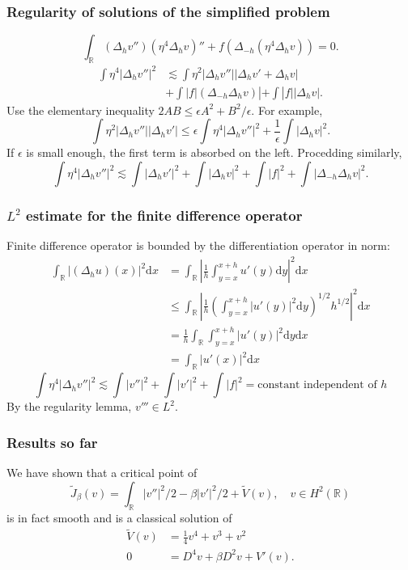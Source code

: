 \documentclass[9pt, english]{beamer}
\theoremstyle{definition}
\newcommand{\R}{\mathbb{R}}                     %
\begin{document}
\begin{frame}
\frametitle{Regularity of solutions of the simplified problem}
\[
\int_\R (\Delta_h v'') (\eta^4 \Delta_h v)'' + f (\Delta_{-h}
(\eta^4 \Delta_h v)) = 0.
\]
\begin{align*}
\int \eta^4 |\Delta_h v''|^2 &\lesssim
\int \eta^2 |\Delta_h v''| |\Delta_h v' + \Delta_h v|\\
&+ \int |f| (\Delta_{-h}\Delta_h v)| + \int |f| |\Delta_h v |.
\end{align*}
\pause Use the elementary inequality $2AB \leq \epsilon A^2 +
B^2/\epsilon$. For example,
\[
\int \eta^2 |\Delta_h v''| |\Delta_h v'| \leq \epsilon \int \eta^4
|\Delta_h v''|^2 + \frac1\epsilon \int |\Delta_h v|^2.
\]
\pause If $\epsilon$ is small enough, the first term is absorbed on
the left. Procedding similarly,
\[
\int \eta^4 |\Delta_h v''|^2 \lesssim \int |\Delta_h v'|^2 + \int
|\Delta_h v|^2 + \int |f|^2 + \int |\Delta_{-h}\Delta_h v|^2.
\]
\end{frame}

\begin{frame}
\frametitle{$L^2$ estimate for the finite difference operator}
\newcommand{\dif}{\text{d}}
Finite difference operator is bounded by the differentiation
operator in norm:
\begin{align*}
\int_\R |(\Delta_h u)(x)|^2 \dif x &= \int_\R \left| \frac{1}{h}
\int_{y=x}^{x+h} u'(y) \dif y
\right|^2 \dif x\\
&\leq \int_\R \left| \frac{1}{h} \left(\int_{y=x}^{x+h} |u'(y)|^2
\dif y \right)^{1/2} h^{1/2}
\right|^2 \dif x\\
&= \frac{1}{h} \int_\R \int_{y=x}^{x+h} |u'(y)|^2 \dif y
\dif x\\
&= \int_\R |u'(x)|^2 \dif x
\end{align*}
\pause
\[
\int \eta^4 |\Delta_h v''|^2 \lesssim \int |v''|^2 + \int |v'|^2 +
\int |f|^2 = \text{constant independent of } h
\]
By the regularity lemma, $v''' \in L^2$.
\end{frame}

\begin{frame}
\frametitle{Results so far} We have shown that a critical point of
\[
\tilde J_\beta(v) = \int_\R |v''|^2 / 2 - \beta |v'|^2 / 2 + \tilde
V(v), \quad v \in H^2(\R)
\]
is in fact smooth and is a classical solution of
\begin{align*}
\tilde V(v) &= \frac14 v^4 + v^3 + v^2\\
0 &= D^4 v + \beta D^2 v + V'(v).
\end{align*}
\end{frame}
\end{document}
